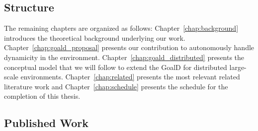 










%
%
%
%
%
%
%


\subsection{Structure}

The remaining chapters are organized as follows: Chapter~\ref{chap:background} introduces the theoretical background underlying our work.  Chapter~\ref{chap:goald_proposal} presents our contribution to autonomously handle dynamicity in the environment. Chapter~\ref{chap:goald_distributed} presents the conceptual model that we will follow to extend the GoalD for distributed large-scale environments.
 Chapter~\ref{chap:related} presents the most relevant related literature work and Chapter~\ref{chap:schedule} presents the schedule for the completion of this thesis.
 
 
 \subsection{Published Work}
 
